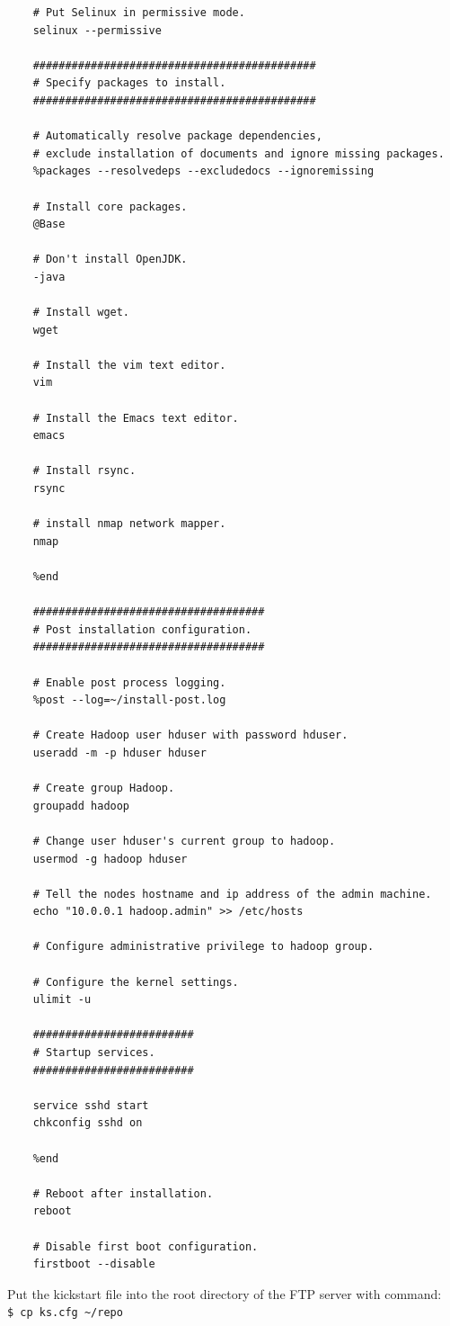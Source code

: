 \begin{lstlisting}
    # Put Selinux in permissive mode.
    selinux --permissive

    ############################################
    # Specify packages to install.
    ############################################

    # Automatically resolve package dependencies,
    # exclude installation of documents and ignore missing packages.
    %packages --resolvedeps --excludedocs --ignoremissing

    # Install core packages.
    @Base

    # Don't install OpenJDK.
    -java

    # Install wget.
    wget

    # Install the vim text editor.
    vim

    # Install the Emacs text editor.
    emacs

    # Install rsync.
    rsync

    # install nmap network mapper.
    nmap

    %end

    ####################################
    # Post installation configuration.
    ####################################

    # Enable post process logging.
    %post --log=~/install-post.log

    # Create Hadoop user hduser with password hduser.
    useradd -m -p hduser hduser

    # Create group Hadoop.
    groupadd hadoop

    # Change user hduser's current group to hadoop.
    usermod -g hadoop hduser

    # Tell the nodes hostname and ip address of the admin machine.
    echo "10.0.0.1 hadoop.admin" >> /etc/hosts

    # Configure administrative privilege to hadoop group.

    # Configure the kernel settings.
    ulimit -u

    #########################
    # Startup services.
    #########################

    service sshd start
    chkconfig sshd on

    %end

    # Reboot after installation.
    reboot

    # Disable first boot configuration.
    firstboot --disable
\end{lstlisting}

Put the kickstart file into the root directory of the FTP server with command: \\
\verb|$ cp ks.cfg ~/repo|

